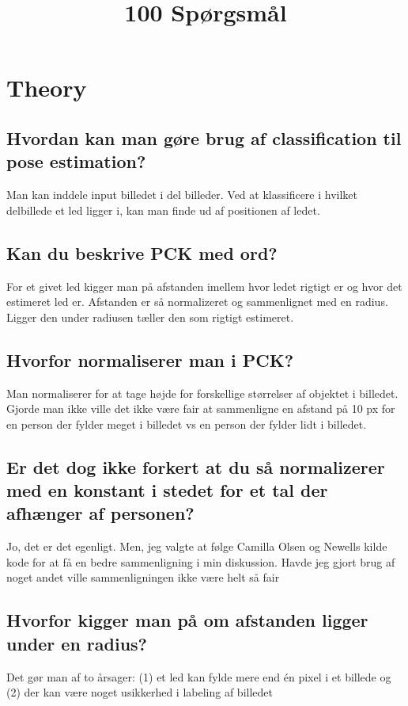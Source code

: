 \documentclass[a4paper]{article}
\begin{document}
\title{100 Spørgsmål}
\author{}
\date{}

\maketitle

\section{Theory}
\subsection{Hvordan kan man gøre brug af classification til pose estimation?}
Man kan inddele input billedet i del billeder. Ved at klassificere i hvilket delbillede et led ligger i, kan man finde ud af positionen af ledet.

\subsection{Kan du beskrive PCK med ord?}
For et givet led kigger man på afstanden imellem hvor ledet rigtigt er og hvor det estimeret led er. Afstanden er så normalizeret og sammenlignet med en radius. Ligger den under radiusen tæller den som rigtigt estimeret.

\subsection{Hvorfor normaliserer man i PCK?}
Man normaliserer for at tage højde for forskellige størrelser af objektet i billedet. Gjorde man ikke ville det ikke være fair at sammenligne en afstand på 10 px for en person der fylder meget i billedet vs en person der fylder lidt i billedet. 

\subsection{Er det dog ikke forkert at du så normalizerer med en konstant i stedet for et tal der afhænger af personen?}
Jo, det er det egenligt. Men, jeg valgte at følge Camilla Olsen og Newells kilde kode for at få en bedre sammenligning i min diskussion. Havde jeg gjort brug af noget andet ville sammenligningen ikke være helt så fair

\subsection{Hvorfor kigger man på om afstanden ligger under en radius?}
Det gør man af to årsager: (1) et led kan fylde mere end én pixel i et billede og (2) der kan være noget usikkerhed i labeling af billedet
\end{document}

